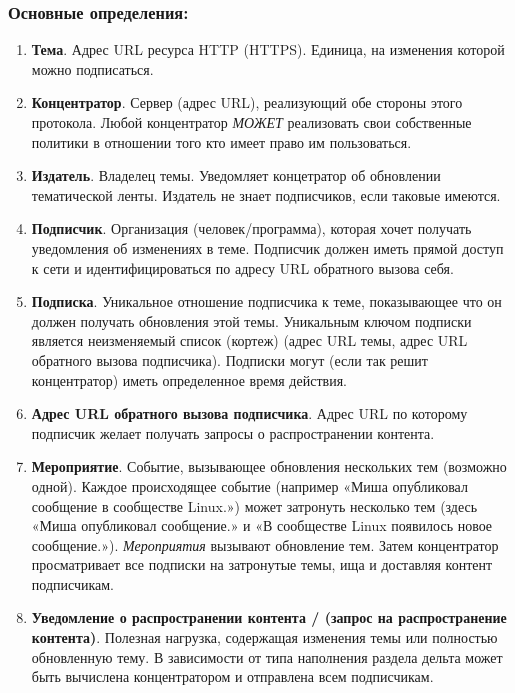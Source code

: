 \hypertarget{ux43eux441ux43dux43eux432ux43dux44bux435-ux43eux43fux440ux435ux434ux435ux43bux435ux43dux438ux44f}{%
\subsubsection{Основные
определения:}\label{ux43eux441ux43dux43eux432ux43dux44bux435-ux43eux43fux440ux435ux434ux435ux43bux435ux43dux438ux44f}}

\begin{enumerate}
\def\labelenumi{\arabic{enumi}.}
\tightlist
\item
  \textbf{Тема}. Адрес URL ресурса HTTP (HTTPS). Единица, на изменения
  которой можно подписаться.
\item
  \textbf{Концентратор}. Сервер (адрес URL), реализующий обе стороны
  этого протокола. Любой концентратор \emph{МОЖЕТ} реализовать свои
  собственные политики в отношении того кто имеет право им пользоваться.
\item
  \textbf{Издатель}. Владелец темы. Уведомляет концетратор об обновлении
  тематической ленты. Издатель не знает подписчиков, если таковые
  имеются.
\item
  \textbf{Подписчик}. Организация (человек/программа), которая хочет
  получать уведомления об изменениях в теме. Подписчик должен иметь
  прямой доступ к сети и идентифицироваться по адресу URL обратного
  вызова себя.
\item
  \textbf{Подписка}. Уникальное отношение подписчика к теме,
  показывающее что он должен получать обновления этой темы. Уникальным
  ключом подписки является неизменяемый список (кортеж) (адрес URL темы,
  адрес URL обратного вызова подписчика). Подписки могут (если так решит
  концентратор) иметь определенное время действия.
\item
  \textbf{Адрес URL обратного вызова подписчика}. Адрес URL по которому
  подписчик желает получать запросы о распространении контента.
\item
  \textbf{Мероприятие}. Событие, вызывающее обновления нескольких тем
  (возможно одной). Каждое происходящее событие (например «Миша
  опубликовал сообщение в сообществе Linux.») может затронуть несколько
  тем (здесь «Миша опубликовал сообщение.» и «В сообществе Linux
  появилось новое сообщение.»). \emph{Мероприятия} вызывают обновление
  тем. Затем концентратор просматривает все подписки на затронутые темы,
  ища и доставляя контент подписчикам.
\item
  \textbf{Уведомление о распространении контента / (запрос на
  распространение контента)}. Полезная нагрузка, содержащая изменения
  темы или полностью обновленную тему. В зависимости от типа наполнения
  раздела дельта может быть вычислена концентратором и отправлена всем
  подписчикам.
\end{enumerate}

